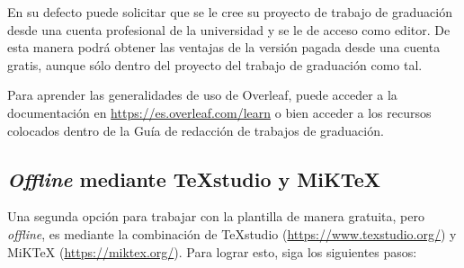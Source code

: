 En su defecto puede solicitar que se le cree su proyecto de trabajo de graduación desde una cuenta profesional de la universidad y se le de acceso como editor. De esta manera podrá obtener las ventajas de la versión pagada desde una cuenta gratis, aunque sólo dentro del proyecto del trabajo de graduación como tal.

Para aprender las generalidades de uso de Overleaf, puede acceder a la documentación en \href{https://es.overleaf.com/learn}{https://es.overleaf.com/learn} o bien acceder a los recursos colocados dentro de la Guía de redacción de trabajos de graduación.

\subsection{\textit{Offline} mediante TeXstudio y MiKTeX}

Una segunda opción para trabajar con la plantilla de manera gratuita, pero \textit{offline}, es mediante la combinación de TeXstudio (\href{https://www.texstudio.org/}{https://www.texstudio.org/}) y MiKTeX (\href{https://miktex.org/}{https://miktex.org/}). Para lograr esto, siga los siguientes pasos:

